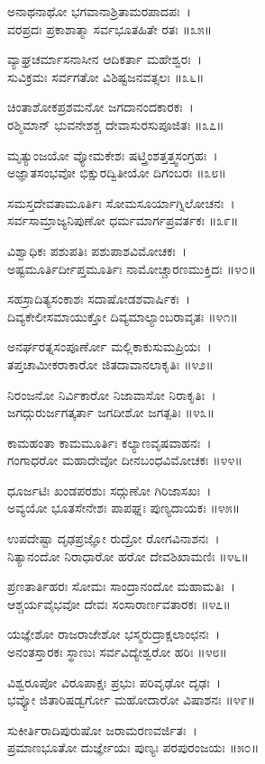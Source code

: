 	ಅನಾಥನಾಥೋ ಭಗವಾನಾಶ್ರಿತಾಮರಪಾದಪಃ~।\\
	ವರಪ್ರದಃ ಪ್ರಕಾಶಾತ್ಮಾ ಸರ್ವಭೂತಹಿತೇ ರತಃ ॥೩೫॥

ವ್ಯಾಘ್ರಚರ್ಮಾಸನಾಸೀನ ಆದಿಕರ್ತಾ ಮಹೇಶ್ವರಃ~।\\
ಸುವಿಕ್ರಮಃ ಸರ್ವಗತೋ ವಿಶಿಷ್ಟಜನವತ್ಸಲಃ ॥೩೬॥

	ಚಿಂತಾಶೋಕಪ್ರಶಮನೋ ಜಗದಾನಂದಕಾರಕಃ~।\\
	ರಶ್ಮಿಮಾನ್ ಭುವನೇಶಶ್ಚ ದೇವಾಸುರಸುಪೂಜಿತಃ ॥೩೭॥

ಮೃತ್ಯುಂಜಯೋ ವ್ಯೋಮಕೇಶಃ ಷಟ್ತ್ರಿಂಶತ್ತತ್ತ್ವಸಂಗ್ರಹಃ~।\\
ಅಜ್ಞಾತಸಂಭವೋ ಭಿಕ್ಷುರದ್ವಿತೀಯೋ ದಿಗಂಬರಃ ॥೩೮॥

	ಸಮಸ್ತದೇವತಾಮೂರ್ತಿಃ ಸೋಮಸೂರ್ಯಾಗ್ನಿಲೋಚನಃ~।\\
	ಸರ್ವಸಾಮ್ರಾಜ್ಯನಿಪುಣೋ ಧರ್ಮಮಾರ್ಗಪ್ರವರ್ತಕಃ ॥೩೯॥

ವಿಶ್ವಾಧಿಕಃ ಪಶುಪತಿಃ ಪಶುಪಾಶವಿಮೋಚಕಃ~।\\
ಅಷ್ಟಮೂರ್ತಿರ್ದೀಪ್ತಮೂರ್ತಿಃ ನಾಮೋಚ್ಚಾರಣಮುಕ್ತಿದಃ ॥೪೦॥

	ಸಹಸ್ರಾದಿತ್ಯಸಂಕಾಶಃ ಸದಾಷೋಡಶವಾರ್ಷಿಕಃ~।\\
	ದಿವ್ಯಕೇಲೀಸಮಾಯುಕ್ತೋ ದಿವ್ಯಮಾಲ್ಯಾಂಬರಾವೃತಃ ॥೪೧॥

ಅನರ್ಘರತ್ನಸಂಪೂರ್ಣೋ ಮಲ್ಲಿಕಾಕುಸುಮಪ್ರಿಯಃ~।\\
ತಪ್ತಚಾಮೀಕರಾಕಾರೋ ಜಿತದಾವಾನಲಾಕೃತಿಃ ॥೪೨॥

	ನಿರಂಜನೋ ನಿರ್ವಿಕಾರೋ ನಿಜಾವಾಸೋ ನಿರಾಕೃತಿಃ~।\\
	ಜಗದ್ಗುರುರ್ಜಗತ್ಕರ್ತಾ ಜಗದೀಶೋ ಜಗತ್ಪತಿಃ ॥೪೩॥

ಕಾಮಹಂತಾ ಕಾಮಮೂರ್ತಿಃ ಕಲ್ಯಾಣವೃಷವಾಹನಃ~।\\
ಗಂಗಾಧರೋ ಮಹಾದೇವೋ ದೀನಬಂಧವಿಮೋಚಕಃ ॥೪೪॥

	ಧೂರ್ಜಟಿಃ ಖಂಡಪರಶುಃ ಸದ್ಗುಣೋ ಗಿರಿಜಾಸಖಃ~।\\
	ಅವ್ಯಯೋ ಭೂತಸೇನೇಶಃ ಪಾಪಘ್ನಃ ಪುಣ್ಯದಾಯಕಃ ॥೪೫॥

ಉಪದೇಷ್ಟಾ ದೃಢಪ್ರಜ್ಞೋ ರುದ್ರೋ ರೋಗವಿನಾಶನಃ~।\\
ನಿತ್ಯಾನಂದೋ ನಿರಾಧಾರೋ ಹರೋ ದೇವಶಿಖಾಮಣಿಃ ॥೪೬॥

	ಪ್ರಣತಾರ್ತಿಹರಃ ಸೋಮಃ ಸಾಂದ್ರಾನಂದೋ ಮಹಾಮತಿಃ~।\\
	ಆಶ್ಚರ್ಯವೈಭವೋ ದೇವಃ ಸಂಸಾರಾರ್ಣವತಾರಕಃ ॥೪೭॥

ಯಜ್ಞೇಶೋ ರಾಜರಾಜೇಶೋ ಭಸ್ಮರುದ್ರಾಕ್ಷಲಾಂಛನಃ~।\\
ಅನಂತಸ್ತಾರಕಃ ಸ್ಥಾಣುಃ ಸರ್ವವಿದ್ಯೇಶ್ವರೋ ಹರಿಃ ॥೪೮॥

	ವಿಶ್ವರೂಪೋ ವಿರೂಪಾಕ್ಷಃ ಪ್ರಭುಃ ಪರಿವೃಢೋ ದೃಢಃ~।\\
	ಭವ್ಯೋ ಜಿತಾರಿಷಡ್ವರ್ಗೋ ಮಹೋದಾರೋ ವಿಷಾಶನಃ ॥೪೯॥

ಸುಕೀರ್ತಿರಾದಿಪುರುಷೋ ಜರಾಮರಣವರ್ಜಿತಃ~।\\
ಪ್ರಮಾಣಭೂತೋ ದುರ್ಜ್ಞೇಯಃ ಪುಣ್ಯಃ ಪರಪುರಂಜಯಃ ॥೫೦॥

